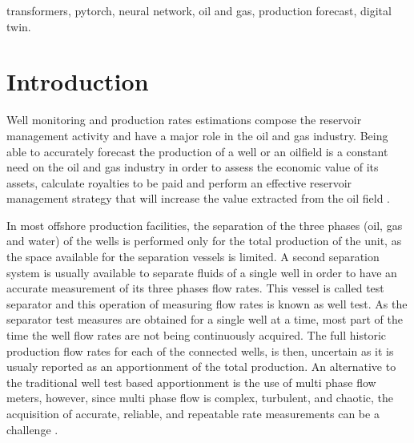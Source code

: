\documentclass[conference]{IEEEtran}
\begin{document}
\begin{IEEEkeywords}
transformers, pytorch, neural network, oil and gas, production forecast, digital twin.
\end{IEEEkeywords}

\section{Introduction}\label{sec:section_introduction}

Well monitoring and production rates estimations compose the reservoir management activity 
and have a major role in the oil and gas industry. Being able to accurately forecast the 
production of a well or an oilfield is a constant need on the oil and gas industry in order 
to assess the economic value of its assets, calculate royalties to be paid and perform an 
effective reservoir management strategy that will increase the value extracted from the oil 
field \cite{alakeely2022simulating}.

In most offshore production facilities, the separation of the three phases (oil, gas and water)
of the wells is performed only for the total production of the unit, as the space available 
for the separation vessels is limited. A second separation system is usually available to 
separate fluids of a single well in order to have an accurate measurement of its three phases 
flow rates. This vessel is called test separator and this operation of measuring flow rates is 
known as well test. As the separator test measures are obtained for a single well at a time, 
most part of the time the well flow rates are not being continuously acquired. The full 
historic production flow rates for each of the connected wells, is then, uncertain as it 
is usualy reported as an apportionment of the total production. An alternative to the 
traditional well test based apportionment is the use of multi phase flow meters, however, 
since multi phase flow is complex, turbulent, and chaotic, the acquisition of accurate, 
reliable, and repeatable rate measurements can be a challenge \cite{Okotie2016}.
\end{document}
